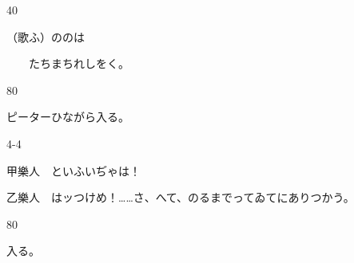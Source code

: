 \documentclass[tate,paper=b6j,jafontsize=9pt]{jlreq}
\begin{document}
\begin{azconvIndented}{4\zw}{0\zw}

（歌ふ）ののは

　　たちまちれしをく。

\end{azconvIndented}
\begin{azconvIndented}{8\zw}{0\zw}

ピーターひながら入る。

\end{azconvIndented}
\begin{azconvIndented}{4\zw}{-4\zw}

甲樂人　といふいぢゃは！

乙樂人　はッつけめ！……さ、へて、のるまでってゐてにありつかう。

\end{azconvIndented}
\begin{azconvIndented}{8\zw}{0\zw}

入る。

\end{azconvIndented}


\end{document}
